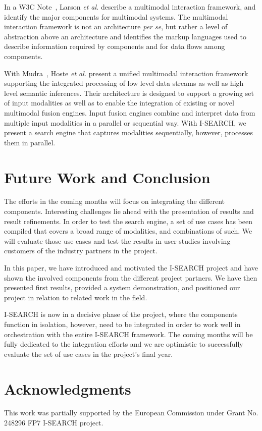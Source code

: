 \documentclass{acm_proc_article-sp}
\newcommand{\inlinelistingsize}{\fontsize{8pt}{11pt}}
\let\oldttdefault\ttdefault
\renewcommand{\ttdefault}{pcr}
\let\oldurl\url
\renewcommand{\url}[1]{\inlinelistingsize\oldurl{#1}}
\begin{document}
In a W3C Note~\cite{w3cmultimodal2003}, Larson \textit{et al.} describe a multimodal interaction framework, and identify the major components for multimodal systems.
The multimodal interaction framework is not an architecture \textit{per se}, but rather a level of abstraction above an architecture and identifies the markup languages used to describe information required by components and for data flows among components.

With Mudra~\cite{mudra2011}, Hoste \textit{et al.} present a unified multimodal interaction framework supporting the integrated processing of low level data streams as well as high level semantic inferences.
Their architecture is designed to support a growing set of input modalities as well as to enable the integration of existing or novel multimodal fusion engines.
Input fusion engines combine and interpret data from multiple input modalities in a parallel or sequential way.
With \mbox{I-SEARCH}, we present a search engine that captures modalities sequentially, however, processes them in parallel.

\section{Future Work and Conclusion} \label{sec:futureworkconclusion}
The efforts in the coming months will focus on integrating the different components.
Interesting challenges lie ahead with the presentation of results and result refinements.
In order to test the search engine, a set of use cases has been compiled that covers a broad range of modalities, and combinations of such.
We will evaluate those use cases and test the results in user studies involving customers of the industry partners in the project.

In this paper, we have introduced and motivated the \mbox{I-SEARCH} project and have shown the involved components from the different project partners.
We have then presented first results, provided a system demonstration, and positioned our project in relation to related work in the field.

\mbox{I-SEARCH} is now in a decisive phase of the project, where the components function in isolation, however, need to be integrated in order to work well in orchestration with the entire \mbox{I-SEARCH} framework.
The coming months will be fully dedicated to the integration efforts and we are optimistic to successfully evaluate the set of use cases in the project's final year.

\section{Acknowledgments}
This work was partially supported by the European Commission under Grant No. 248296 FP7 \mbox{I-SEARCH} project.

\let\ttdefault\oldttdefault
\let\url\oldurl




\balancecolumns
\end{document}
